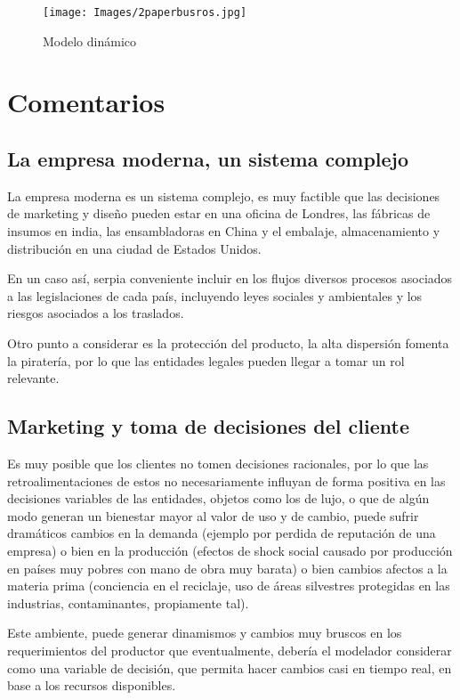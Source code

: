 \documentclass{article}
\begin{document}
\begin{figure}[H]
\texttt{[image: Images/2paperbusros.jpg]}
\centering
\caption{Modelo dinámico \cite{art1:a1}}
\label{dinamico}
\end{figure}


\section{Comentarios}

\subsection{La empresa moderna, un sistema complejo }

La empresa moderna es un sistema complejo, es muy factible que las decisiones de marketing y diseño pueden estar en una oficina de Londres, las fábricas de insumos en india, las ensambladoras en China y el embalaje, almacenamiento y distribución en una ciudad de Estados Unidos.

En un caso así, serpia conveniente incluir en los flujos diversos procesos asociados a las legislaciones de cada país, incluyendo leyes sociales y ambientales y los riesgos asociados a los traslados.

Otro punto a considerar es la protección del producto, la alta dispersión fomenta la piratería, por lo que las entidades legales pueden llegar a tomar un rol relevante. 



\subsection{Marketing y toma de decisiones del cliente}

Es muy posible que los clientes no tomen decisiones racionales, por lo que las retroalimentaciones de estos no necesariamente influyan de forma positiva en las decisiones variables de las entidades, objetos como los de lujo, o que de algún modo generan un bienestar mayor al valor de uso y de cambio, puede sufrir dramáticos cambios en la demanda (ejemplo por perdida de reputación de una empresa) o bien en la producción (efectos de shock social causado por producción en países muy pobres con mano de obra muy barata) o bien cambios afectos a la materia prima (conciencia en el reciclaje, uso de áreas silvestres protegidas en las industrias, contaminantes, propiamente tal).

Este ambiente, puede generar dinamismos y cambios muy bruscos en los requerimientos del productor que eventualmente, debería el modelador considerar como una variable de decisión, que permita hacer cambios casi en tiempo real, en base a los recursos disponibles.
\end{document}
